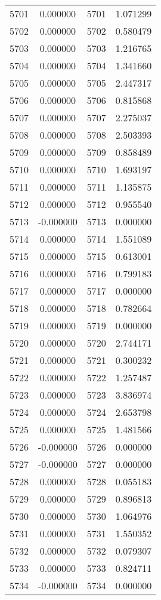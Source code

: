\documentclass[12pt]{article}
\begin{document}
\begin{longtable}{@{}cccc@{}}
5701 & 0.000000 & 5701 & 1.071299 \\
5702 & 0.000000 & 5702 & 0.580479 \\
5703 & 0.000000 & 5703 & 1.216765 \\
5704 & 0.000000 & 5704 & 1.341660 \\
5705 & 0.000000 & 5705 & 2.447317 \\
5706 & 0.000000 & 5706 & 0.815868 \\
5707 & 0.000000 & 5707 & 2.275037 \\
5708 & 0.000000 & 5708 & 2.503393 \\
5709 & 0.000000 & 5709 & 0.858489 \\
5710 & 0.000000 & 5710 & 1.693197 \\
5711 & 0.000000 & 5711 & 1.135875 \\
5712 & 0.000000 & 5712 & 0.955540 \\
5713 & -0.000000 & 5713 & 0.000000 \\
5714 & 0.000000 & 5714 & 1.551089 \\
5715 & 0.000000 & 5715 & 0.613001 \\
5716 & 0.000000 & 5716 & 0.799183 \\
5717 & 0.000000 & 5717 & 0.000000 \\
5718 & 0.000000 & 5718 & 0.782664 \\
5719 & 0.000000 & 5719 & 0.000000 \\
5720 & 0.000000 & 5720 & 2.744171 \\
5721 & 0.000000 & 5721 & 0.300232 \\
5722 & 0.000000 & 5722 & 1.257487 \\
5723 & 0.000000 & 5723 & 3.836974 \\
5724 & 0.000000 & 5724 & 2.653798 \\
5725 & 0.000000 & 5725 & 1.481566 \\
5726 & -0.000000 & 5726 & 0.000000 \\
5727 & -0.000000 & 5727 & 0.000000 \\
5728 & 0.000000 & 5728 & 0.055183 \\
5729 & 0.000000 & 5729 & 0.896813 \\
5730 & 0.000000 & 5730 & 1.064976 \\
5731 & 0.000000 & 5731 & 1.550352 \\
5732 & 0.000000 & 5732 & 0.079307 \\
5733 & 0.000000 & 5733 & 0.824711 \\
5734 & -0.000000 & 5734 & 0.000000 \\

\end{longtable}
\end{document}
